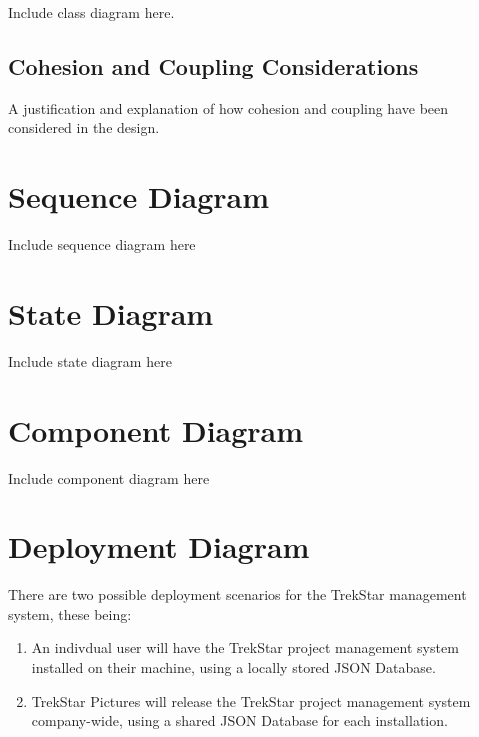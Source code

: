 \documentclass[
  english,
  a4paper,
,tablecaptionabove
]{scrartcl}
\providecommand{\tightlist}{%
  \setlength{\itemsep}{0pt}\setlength{\parskip}{0pt}}
\begin{document}
Include class diagram here.

\hypertarget{cohesion-and-coupling-considerations}{%
\subsection{Cohesion and Coupling
Considerations}\label{cohesion-and-coupling-considerations}}

A justification and explanation of how cohesion and coupling have been
considered in the design.

\newpage

\hypertarget{sequence-diagram}{%
\section{Sequence Diagram}\label{sequence-diagram}}

Include sequence diagram here

\newpage

\hypertarget{state-diagram}{%
\section{State Diagram}\label{state-diagram}}

Include state diagram here

\newpage

\hypertarget{component-diagram}{%
\section{Component Diagram}\label{component-diagram}}

Include component diagram here

\newpage

\hypertarget{deployment-diagram}{%
\section{Deployment Diagram}\label{deployment-diagram}}

There are two possible deployment scenarios for the TrekStar management
system, these being:

\begin{enumerate}
\def\labelenumi{\arabic{enumi}.}
\tightlist
\item
  An indivdual user will have the TrekStar project management system
  installed on their machine, using a locally stored JSON Database.
\item
  TrekStar Pictures will release the TrekStar project management system
  company-wide, using a shared JSON Database for each installation.
\end{enumerate}
\end{document}
